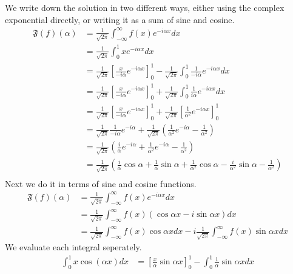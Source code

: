 \documentclass[11pt]{article}
\begin{document}
\begin{solution}     
    We write down the solution in two different ways, either using the complex exponential directly, or writing it as a sum of sine and cosine.
    \begin{align*}
        \mathfrak{F}(f)(\alpha)&=\frac{1}{\sqrt{2 \pi}} \int_{-\infty}^{\infty} f(x) e^{-i \alpha x} d x\\
        &=\frac{1}{\sqrt{2 \pi}} \int_{0}^{1} x e^{-i \alpha x} d x\\
        &=\frac{1}{\sqrt{2 \pi}} \left[ \frac{x}{-i\alpha} e^{-i \alpha x} \right]_0^1 - \frac{1}{\sqrt{2 \pi}} \int_{0}^{1} \frac{1}{-i\alpha} e^{-i \alpha x} d x\\
        &=\frac{1}{\sqrt{2 \pi}} \left[ \frac{x}{-i\alpha} e^{-i \alpha x} \right]_0^1 + \frac{1}{\sqrt{2 \pi}} \int_{0}^{1} \frac{1}{i\alpha} e^{-i \alpha x} d x\\
        &=\frac{1}{\sqrt{2 \pi}} \left[ \frac{x}{-i\alpha} e^{-i \alpha x} \right]_0^1 + \frac{1}{\sqrt{2 \pi}} \left[ \frac{1}{\alpha^2} e^{-
        i \alpha x} \right]_{0}^1\\
        &=\frac{1}{\sqrt{2 \pi}} \frac{1}{-i\alpha} e^{-i \alpha } + \frac{1}{\sqrt{2 \pi}} \left( \frac{1}{\alpha^2} e^{-i \alpha} -\frac{1}{\alpha^2}\right)\\
        &=\frac{1}{\sqrt{2 \pi}}\left( \frac{i}{\alpha} e^{-i \alpha } + \frac{1}{\alpha^2} e^{-i \alpha} -\frac{1}{\alpha^2}\right)\\ 
        &=\frac{1}{\sqrt{2 \pi}}\left( \frac{i}{\alpha} \cos\alpha  + \frac{1}{\alpha} \sin\alpha + \frac{1}{\alpha^2} \cos\alpha - \frac{i}{\alpha^2} \sin\alpha -\frac{1}{\alpha^2}\right)\\ 
    \end{align*}
    Next we do it in terms of sine and cosine functions.
    \[
    \begin{aligned}
    \mathfrak{F}(f)(\alpha)&=\frac{1}{\sqrt{2 \pi}} \int_{-\infty}^{\infty} f(x) e^{-i \alpha x} d x\\
    &=\frac{1}{\sqrt{2 \pi}} \int_{-\infty}^{\infty} f(x)(\cos \alpha x - i\sin\alpha x) d x\\
    & = \frac{1}{\sqrt{2 \pi}} \int_{-\infty}^{\infty} f(x) \cos\alpha x d x - i\frac{1}{\sqrt{2 \pi}} \int_{-\infty}^{\infty} f(x) \sin\alpha x d x
    \end{aligned}
    \]
    We evaluate each integral seperately.
    \begin{align*} 
        \int_0^1 x \cos (\alpha x) d x 
        & =
        \left[\frac{x}{\alpha} \sin \alpha x\right]_0^1-\int_0^1 \frac{1}{\alpha} \sin \alpha x d x 

\end{align*}
\end{solution}
\end{document}

